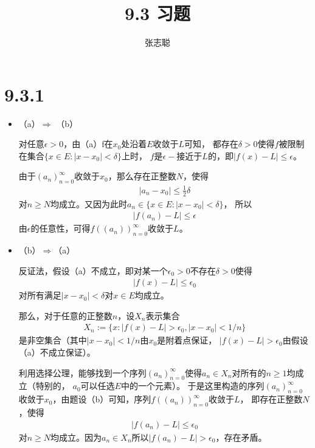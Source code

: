 \documentclass{article}
\begin{document}
\title{9.3 习题}
\author{张志聪}
\maketitle

\section*{9.3.1}

\begin{itemize}
  \item （a）$\Rightarrow$ （b）

        对任意$\epsilon > 0$，由（a）f在$x_0$处沿着$E$收敛于$L$可知，
        都存在$\delta > 0$使得$f$被限制在集合$\{x \in E: |x - x_0| < \delta\}$上时，
        $f$是$\epsilon-$接近于$L$的，即$|f(x) - L| \leq \epsilon$。

        由于$(a_n)_{n=0}^\infty$收敛于$x_0$，那么存在正整数$N$，使得
        \begin{align*}
          |a_n - x_0| \leq \frac{1}{2} \delta
        \end{align*}
        对$n \geq N$均成立。又因为此时$a_n \in \{x \in E: |x - x_0| < \delta\}$，
        所以
        \begin{align*}
          |f(a_n) - L| \leq \epsilon
        \end{align*}
        由$\epsilon$的任意性，可得$f((a_n))_{n=0}^\infty$收敛于$L$。

  \item （b）$\Rightarrow$（a）

        反证法，假设（a）不成立，即对某一个$\epsilon _{0} > 0$不存在$\delta > 0$使得
        \begin{align*}
          |f(x) - L| \leq \epsilon_{0}
        \end{align*}
        对所有满足$|x - x_0| < \delta$对$x \in E$均成立。

        那么，对于任意的正整数$n$，设$X_n$表示集合
        \begin{align*}
          X_n := \{x: |f(x) - L| > \epsilon_{0}, |x - x_0| < 1/n\}
        \end{align*}
        是非空集合（其中$|x - x_0| < 1/n$由$x_0$是附着点保证，
        $|f(x) - L| > \epsilon_{0}$由假设（a）不成立保证）。

        利用选择公理，能够找到一个序列$(a_n)_{n=0}^\infty$使得$a_n \in X_n$对所有的$n \geq 1$均成立（特别的，
        $a_0$可以任选$E$中的一个元素）。
        于是这里构造的序列$(a_n)_{n=0}^\infty$收敛于$x_0$，由题设（b）可知，序列$f((a_n))_{n=0}^\infty$收敛于$L$，
        即存在正整数$N$，使得
        \begin{align*}
          |f(a_n) - L| \leq \epsilon_{0}
        \end{align*}
        对$n \geq N$均成立。因为$a_n \in X_n$所以$|f(a_n) -L| > \epsilon_{0}$，存在矛盾。

\end{itemize}
\end{document}
